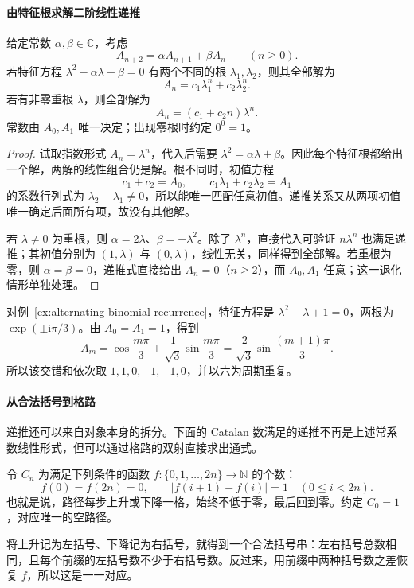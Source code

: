\documentclass[lang=cn,a4paper,fontset=none,zihao=false,10pt,openany,twoside]{beautybook}
\numberwithin{algorithm}{chapter}
\newcommand{\N}{\mathbb N}
\begin{document}
\paragraph{由特征根求解二阶线性递推}
\begin{proposition}[二阶常系数齐次递推]\label{prop:second-order-recurrence}
给定常数 $\alpha,\beta\in\mathbb C$，考虑
\[
 A_{n+2}=\alpha A_{n+1}+\beta A_n\qquad(n\ge0).
\]
若特征方程 $\lambda^2-\alpha\lambda-\beta=0$ 有两个不同的根 $\lambda_1,\lambda_2$，则其全部解为
\[
 A_n=c_1\lambda_1^n+c_2\lambda_2^n.
\]
若有非零重根 $\lambda$，则全部解为
\[
 A_n=(c_1+c_2n)\lambda^n.
\]
常数由 $A_0,A_1$ 唯一决定；出现零根时约定 $0^0=1$。
\end{proposition}
\begin{proof}
试取指数形式 $A_n=\lambda^n$，代入后需要 $\lambda^2=\alpha\lambda+\beta$。因此每个特征根都给出一个解，两解的线性组合仍是解。根不同时，初值方程
\[
 c_1+c_2=A_0,\qquad
 c_1\lambda_1+c_2\lambda_2=A_1
\]
的系数行列式为 $\lambda_2-\lambda_1\ne0$，所以能唯一匹配任意初值。递推关系又从两项初值唯一确定后面所有项，故没有其他解。

若 $\lambda\ne0$ 为重根，则 $\alpha=2\lambda$、$\beta=-\lambda^2$。除了 $\lambda^n$，直接代入可验证 $n\lambda^n$ 也满足递推；其初值分别为 $(1,\lambda)$ 与 $(0,\lambda)$，线性无关，同样得到全部解。若重根为零，则 $\alpha=\beta=0$，递推式直接给出 $A_n=0$（$n\ge2$），而 $A_0,A_1$ 任意；这一退化情形单独处理。
\end{proof}
对例~\ref{ex:alternating-binomial-recurrence}，特征方程是 $\lambda^2-\lambda+1=0$，两根为 $\exp(\pm\mathrm i\pi/3)$。由 $A_0=A_1=1$，得到
\[
 A_m=\cos\frac{m\pi}{3}+\frac1{\sqrt3}\sin\frac{m\pi}{3}
 =\frac2{\sqrt3}\sin\frac{(m+1)\pi}{3}.
\]
所以该交错和依次取 $1,1,0,-1,-1,0$，并以六为周期重复。

\paragraph{从合法括号到格路}
递推还可以来自对象本身的拆分。下面的 Catalan 数满足的递推不再是上述常系数线性形式，但可以通过格路的双射直接求出通式。
\begin{definition}[Catalan 数]\label{def:catalan}
令 $C_n$ 为满足下列条件的函数 $f:\{0,1,\ldots,2n\}\to\N$ 的个数：
\[
 f(0)=f(2n)=0,\qquad |f(i+1)-f(i)|=1\quad(0\le i<2n).
\]
也就是说，路径每步上升或下降一格，始终不低于零，最后回到零。约定 $C_0=1$，对应唯一的空路径。
\end{definition}
将上升记为左括号、下降记为右括号，就得到一个合法括号串：左右括号总数相同，且每个前缀的左括号数不少于右括号数。反过来，用前缀中两种括号数之差恢复 $f$，所以这是一一对应。
\end{document}
